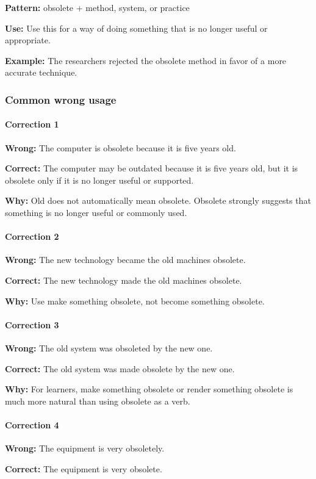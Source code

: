 \documentclass[11pt]{article}
\begin{document}
\textbf{Pattern:} obsolete + method, system, or practice

\textbf{Use:} Use this for a way of doing something that is no longer useful or appropriate.

\textbf{Example:} The researchers rejected the obsolete method in favor of a more accurate technique.

\subsubsection{Common wrong usage}
\paragraph{Correction 1}
\textbf{Wrong:} The computer is obsolete because it is five years old.

\textbf{Correct:} The computer may be outdated because it is five years old, but it is obsolete only if it is no longer useful or supported.

\textbf{Why:} Old does not automatically mean obsolete. Obsolete strongly suggests that something is no longer useful or commonly used.

\paragraph{Correction 2}
\textbf{Wrong:} The new technology became the old machines obsolete.

\textbf{Correct:} The new technology made the old machines obsolete.

\textbf{Why:} Use make something obsolete, not become something obsolete.

\paragraph{Correction 3}
\textbf{Wrong:} The old system was obsoleted by the new one.

\textbf{Correct:} The old system was made obsolete by the new one.

\textbf{Why:} For learners, make something obsolete or render something obsolete is much more natural than using obsolete as a verb.

\paragraph{Correction 4}
\textbf{Wrong:} The equipment is very obsoletely.

\textbf{Correct:} The equipment is very obsolete.
\end{document}
